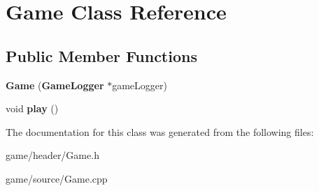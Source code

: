 \section{Game Class Reference}
\label{class_game}
\subsection*{Public Member Functions}
\begin{DoxyCompactItemize}
\item 
{\bfseries Game} ({\bf Game\-Logger} $\ast$game\-Logger)\label{class_game_a9f03a276b1af77e70e794ac22ded922e}

\item 
void {\bfseries play} ()\label{class_game_aa333825d0bca80e91e53c7e23f053405}

\end{DoxyCompactItemize}


The documentation for this class was generated from the following files\-:\begin{DoxyCompactItemize}
\item 
game/header/Game.\-h\item 
game/source/Game.\-cpp\end{DoxyCompactItemize}
